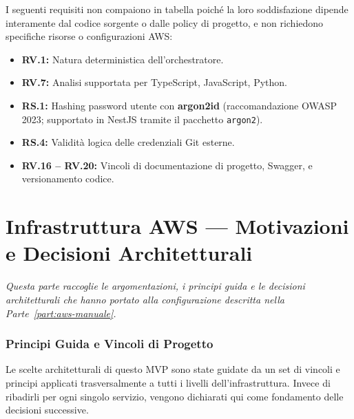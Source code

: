 \documentclass[11pt,a4paper]{article}
\begin{document}
I seguenti requisiti non compaiono in tabella poiché la loro soddisfazione dipende interamente dal codice sorgente o dalle policy di progetto, e non richiedono specifiche risorse o configurazioni AWS:

\begin{itemize}
    \item \textbf{RV.1:} Natura deterministica dell'orchestratore.
    \item \textbf{RV.7:} Analisi supportata per TypeScript, JavaScript, Python.
    \item \textbf{RS.1:} Hashing password utente con \textbf{argon2id} (raccomandazione OWASP 2023; supportato in NestJS tramite il pacchetto \texttt{argon2}).
    \item \textbf{RS.4:} Validità logica delle credenziali Git esterne.
    \item \textbf{RV.16 -- RV.20:} Vincoli di documentazione di progetto, Swagger, e versionamento codice.
\end{itemize}

\part{Infrastruttura AWS --- Motivazioni e Decisioni Architetturali}
\label{part:aws-adr}

\emph{Questa parte raccoglie le argomentazioni, i principi guida e le decisioni architetturali che hanno portato alla configurazione descritta nella Parte~\ref{part:aws-manuale}.}

\section{Principi Guida e Vincoli di Progetto}
\label{sec:aws-principi}

Le scelte architetturali di questo MVP sono state guidate da un set di vincoli e principi applicati trasversalmente a tutti i livelli dell'infrastruttura. Invece di ribadirli per ogni singolo servizio, vengono dichiarati qui come fondamento delle decisioni successive.
\end{document}
